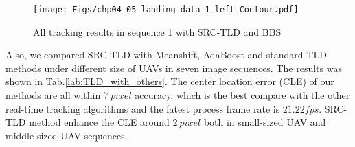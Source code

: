 \begin{figure}[!th]
	\centering
	\texttt{[image: Figs/chp04\_05\_landing\_data\_1\_left\_Contour.pdf]}
	\caption{All tracking results in sequence 1 with SRC-TLD and BBS}
	\label{fig:chp04_05_landing_data_1_left_Contour}    
\end{figure}

Also, we compared SRC-TLD with Meanshift, AdaBoost and standard TLD methods under different size of UAVs in seven image sequences. The results was shown in Tab.\ref{lab:TLD_with_others}. The center location error (CLE) of our methods are all within $7\ pixel$ accuracy, which is the best compare with the other real-time tracking algorithms and the fatest process frame rate is $21.22 fps$. SRC-TLD method enhance the CLE around $2\ pixel$ both in small-sized UAV and middle-sized UAV sequences.

